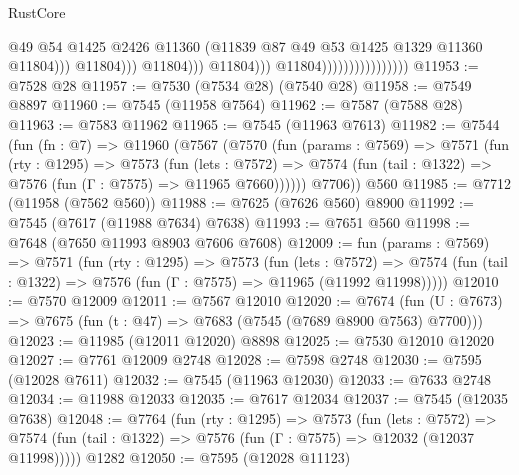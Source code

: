 \begin{lexlean}{RustCore}
\begin{coremodule}
                                                          @49
                                                          @54
                                                          @1425
                                                          @2426
                                                          @11360
                                                          (@11839
                                                            @87
                                                            @49
                                                            @53
                                                            @1425
                                                            @1329
                                                            @11360
                                                            @11804)))
                                                      @11804)))
                                                @11804)))
                                          @11804)))
                                    @11804))))))))))))))))
@11953 := @7528 @28
@11957 := @7530 (@7534 @28) (@7540 @28)
@11958 := @7549 @8897
@11960 := @7545 (@11958 @7564)
@11962 := @7587 (@7588 @28)
@11963 := @7583 @11962
@11965 := @7545 (@11963 @7613)
@11982 := @7544
    (fun (fn : @7) =>
    @11960
      (@7567
        (@7570
          (fun (params : @7569) =>
          @7571
            (fun (rty : @1295) =>
            @7573
              (fun (lets : @7572) =>
              @7574 (fun (tail : @1322) => @7576 (fun (Γ : @7575) => @11965 @7660))))))
        @7706))
    @560
@11985 := @7712 (@11958 (@7562 @560))
@11988 := @7625 (@7626 @560) @8900
@11992 := @7545 (@7617 (@11988 @7634) @7638)
@11993 := @7651 @560
@11998 := @7648 (@7650 @11993 @8903 @7606 @7608)
@12009 := fun (params : @7569) =>
  @7571
    (fun (rty : @1295) =>
    @7573
      (fun (lets : @7572) =>
      @7574 (fun (tail : @1322) => @7576 (fun (Γ : @7575) => @11965 (@11992 @11998)))))
@12010 := @7570 @12009
@12011 := @7567 @12010
@12020 := @7674
    (fun (U : @7673) => @7675 (fun (t : @47) => @7683 (@7545 (@7689 @8900 @7563) @7700)))
@12023 := @11985 (@12011 @12020) @8898
@12025 := @7530 @12010 @12020
@12027 := @7761 @12009 @2748
@12028 := @7598 @2748
@12030 := @7595 (@12028 @7611)
@12032 := @7545 (@11963 @12030)
@12033 := @7633 @2748
@12034 := @11988 @12033
@12035 := @7617 @12034
@12037 := @7545 (@12035 @7638)
@12048 := @7764
    (fun (rty : @1295) =>
    @7573
      (fun (lets : @7572) =>
      @7574 (fun (tail : @1322) => @7576 (fun (Γ : @7575) => @12032 (@12037 @11998)))))
    @1282
@12050 := @7595 (@12028 @11123)

\end{coremodule}
\end{lexlean}
